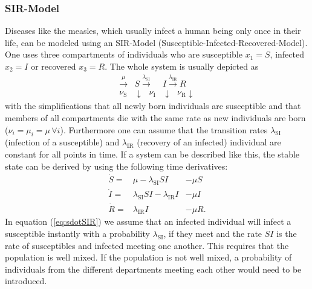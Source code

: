 \subsubsection{SIR-Model}
Diseases like the measles, which usually infect a human being only once in their life, can be modeled using an SIR-Model (Susceptible-Infected-Recovered-Model). One uses three compartments of individuals who are susceptible $x_1 = S$, infected $x_2=I$ or recovered $x_3=R$. The whole system is usually depicted as 
\begin{eqnarray}
\xrightarrow{\mu} &S \xrightarrow{\lambda_\text{SI}} &I  \xrightarrow{\lambda_\text{IR}} R  \\
{\nu_\text{S}} & \downarrow \text{         }\nu_\text{I} &\downarrow \text{  } {\nu_\text{R}} \downarrow \nonumber
\end{eqnarray}
with the simplifications that all newly born individuals are susceptible and that members of all compartments die with the same rate as new individuals are born ($\nu_i = \mu_i = \mu\, \forall i$). Furthermore one can assume that the transition rates $\lambda_\text{SI}$ (infection of a susceptible) and $\lambda_\text{IR}$ (recovery of an infected) individual are constant for all points in time.
If a system can be described like this, the stable state can be derived by using the following time derivatives:
\begin{eqnarray}
\dot{S} =& \mu -\lambda_\text{SI} SI &-  \mu S  \label{eq:sdotSIR}\\ 
\dot{I} =& \lambda_\text{SI} SI - \lambda_\text{IR} I  &-\mu I \\
\dot{R} =& \lambda_\text{IR} I & -\mu R. \label{eq:rdotsir}
\end{eqnarray}
In equation (\ref{eq:sdotSIR}) we assume that an infected individual will infect a susceptible instantly with a probability $\lambda_\text{SI}$, if they meet and the rate $SI$ is the rate of susceptibles and infected meeting one another. This requires that the population is well mixed. If the population is not well mixed, a probability of individuals from the different departments meeting each other would need to be introduced. 

